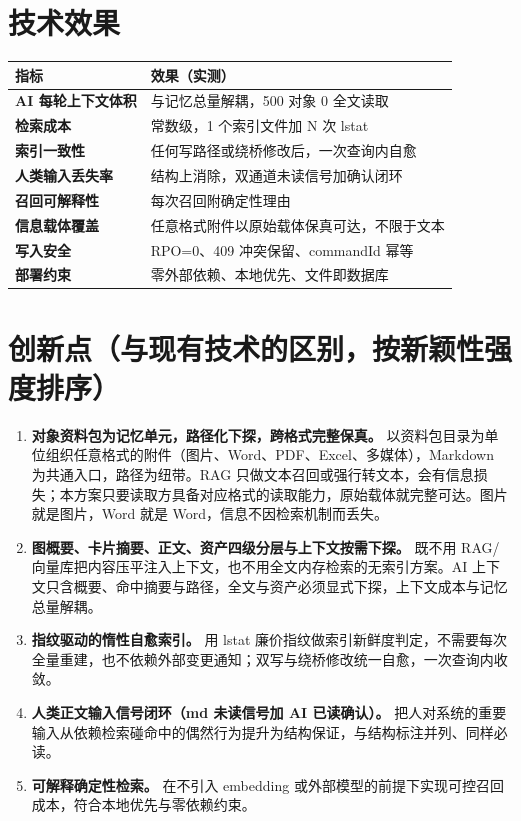 \documentclass[12pt,a4paper]{article}
\begin{document}
\section{技术效果}
\begin{center}
\begin{tabular}{>{\bfseries}p{3.6cm}p{8.8cm}}
\toprule
指标 & 效果（实测）\\
\midrule
AI 每轮上下文体积 & 与记忆总量解耦，500 对象 0 全文读取\\
检索成本 & 常数级，1 个索引文件加 N 次 lstat\\
索引一致性 & 任何写路径或绕桥修改后，一次查询内自愈\\
人类输入丢失率 & 结构上消除，双通道未读信号加确认闭环\\
召回可解释性 & 每次召回附确定性理由\\
信息载体覆盖 & 任意格式附件以原始载体保真可达，不限于文本\\
写入安全 & RPO=0、409 冲突保留、commandId 幂等\\
部署约束 & 零外部依赖、本地优先、文件即数据库\\
\bottomrule
\end{tabular}
\end{center}

\section{创新点（与现有技术的区别，按新颖性强度排序）}
\begin{enumerate}[leftmargin=2em,itemsep=3pt]
\item \textbf{对象资料包为记忆单元，路径化下探，跨格式完整保真。} 以资料包目录为单位组织任意格式的附件（图片、Word、PDF、Excel、多媒体），Markdown 为共通入口，路径为纽带。RAG 只做文本召回或强行转文本，会有信息损失；本方案只要读取方具备对应格式的读取能力，原始载体就完整可达。图片就是图片，Word 就是 Word，信息不因检索机制而丢失。
\item \textbf{图概要、卡片摘要、正文、资产四级分层与上下文按需下探。} 既不用 RAG/向量库把内容压平注入上下文，也不用全文内存检索的无索引方案。AI 上下文只含概要、命中摘要与路径，全文与资产必须显式下探，上下文成本与记忆总量解耦。
\item \textbf{指纹驱动的惰性自愈索引。} 用 lstat 廉价指纹做索引新鲜度判定，不需要每次全量重建，也不依赖外部变更通知；双写与绕桥修改统一自愈，一次查询内收敛。
\item \textbf{人类正文输入信号闭环（md 未读信号加 AI 已读确认）。} 把人对系统的重要输入从依赖检索碰命中的偶然行为提升为结构保证，与结构标注并列、同样必读。
\item \textbf{可解释确定性检索。} 在不引入 embedding 或外部模型的前提下实现可控召回成本，符合本地优先与零依赖约束。
\end{enumerate}
\end{document}
